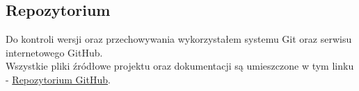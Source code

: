 \begin{flushleft}
\section{\LARGE{Repozytorium}}
\end{flushleft}

\begin{flushleft}
    \hspace{5mm}Do kontroli wersji oraz przechowywania wykorzystałem systemu Git oraz serwisu internetowego GitHub.
    \\
    \hspace{5mm}Wszystkie pliki źródłowe projektu oraz dokumentacji są umieszczone w tym linku - {\color{blue}\href{https://github.com/clowd1e/Szpital}{Repozytorium GitHub}}.
\end{flushleft}
\newpage